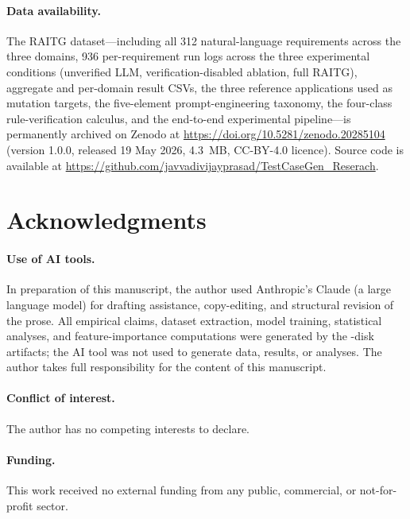 \documentclass[10pt,twocolumn,letterpaper]{article}
\begin{document}
\paragraph{Data availability.} The RAITG dataset---including all 312
natural-language requirements across the three domains, 936
per-requirement run logs across the three experimental conditions
(unverified LLM, verification-disabled ablation, full RAITG), aggregate
and per-domain result CSVs, the three reference applications used as
mutation targets, the five-element prompt-engineering taxonomy, the
four-class rule-verification calculus, and the end-to-end experimental
pipeline---is permanently archived on Zenodo at
\url{https://doi.org/10.5281/zenodo.20285104} (version 1.0.0, released
19 May 2026, 4.3~MB, CC-BY-4.0 licence). Source code is available at
\url{https://github.com/javvadivijayprasad/TestCaseGen_Reserach}.

\section*{Acknowledgments}
\paragraph{Use of AI tools.} In preparation of this manuscript, the
author used Anthropic's Claude (a large language model) for drafting
assistance, copy-editing, and structural revision of the prose. All
empirical claims, dataset extraction, model training, statistical
analyses, and feature-importance computations were generated by the
-disk artifacts; the
AI tool was not used to generate data, results, or analyses. The
author takes full responsibility for the content of this manuscript.

\paragraph{Conflict of interest.} The author has no competing
interests to declare.

\paragraph{Funding.} This work received no external funding from any
public, commercial, or not-for-profit sector.



\end{document}

